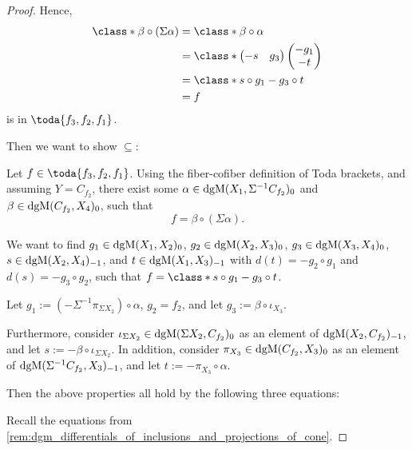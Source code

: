 \begin{proof}
    Hence,
    \begin{align*}
        \class*{\beta \circ (\Sigma \alpha)} &= \class*{\beta \circ \alpha} \\
        &=
        \class*{
            \begin{pmatrix}
                - s & g_3
            \end{pmatrix}
            \begin{pmatrix}
                - g_1 \\
                - t
            \end{pmatrix}
        } \\
        &= \class*{ s \circ g_1 - g_3 \circ t } \\
        &= f
    \end{align*}
    is in \( \toda{f_3, f_2, f_1} \).

    Then we want to show \( \subseteq \):

    Let \( f \in \toda{f_3, f_2, f_1} \). Using the fiber-cofiber definition of Toda brackets, and assuming \( Y = C_{f_2} \), there exist some \( \alpha \in \operatorname{dgM}(X_1, \Sigma^{-1} C_{f_2})_0 \) and \( \beta \in \operatorname{dgM}(C_{f_2}, X_4)_0 \), such that
    \[
        f = \beta \circ (\Sigma \alpha).
    \]

    We want to find \( g_1 \in \operatorname{dgM}(X_1, X_2)_0 \), \( g_2 \in \operatorname{dgM}(X_2, X_3)_0 \), \( g_3 \in \operatorname{dgM}(X_3, X_4)_0 \), \( s \in \operatorname{dgM}(X_2, X_4)_{-1} \), and \( t \in \operatorname{dgM}(X_1, X_3)_{-1} \) with \( d(t) = - g_2 \circ g_1 \) and \( d(s) = -g_3 \circ g_2 \), such that \( f = \class*{s \circ g_1 - g_3 \circ t} \).

    Let \( g_1 := (-\Sigma^{-1} \pi_{\Sigma X_2}) \circ \alpha \), \( g_2 = f_2 \), and let \( g_3 := \beta \circ \iota_{X_3} \). 

    Furthermore, consider \( \iota_{\Sigma X_2} \in \operatorname{dgM}(\Sigma X_2, C_{f_2})_0 \) as an element of \( \operatorname{dgM}(X_2, C_{f_2})_{-1} \), and let \( s := - \beta \circ \iota_{\Sigma X_2} \). In addition, consider \( \pi_{X_3} \in \operatorname{dgM}(C_{f_2}, X_3)_0 \) as an element of \( \operatorname{dgM}(\Sigma^{-1} C_{f_2}, X_3)_{-1} \), and let \( t := - \pi_{X_3} \circ \alpha \).

    Then the above properties all hold by the following three equations:

    Recall the equations from \autoref{rem:dgm_differentials_of_inclusions_and_projections_of_cone}.


\end{proof}
